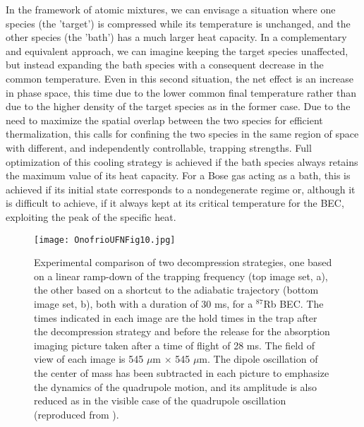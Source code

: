 \documentclass[pra,letterpaper,twocolumn,showpacs,superscriptaddress]{revtex4}
\begin{document}
In the framework of atomic mixtures, we can envisage a situation where one species (the 'target') is compressed while its temperature 
is unchanged, and the other species (the 'bath') has a much larger heat capacity. In a complementary and equivalent approach, we can 
imagine keeping the target species unaffected, but instead expanding the bath species with a consequent decrease in the common temperature. 
Even in this second situation, the net effect is an increase in phase space, this time due to the lower common final temperature rather than  
due to the higher density of the target species as in the former case. Due to the need to maximize the spatial overlap between the two species for 
efficient thermalization, this calls for confining the two species in the same region of space with different, and independently controllable, trapping strengths. 
Full optimization of this cooling strategy is achieved if the bath species always retains the maximum value of its heat capacity. 
For a Bose gas acting as a bath, this is achieved if its initial state corresponds to a nondegenerate regime or, although it is difficult to achieve, 
if it always kept at its critical temperature for the BEC, exploiting the peak of the specific heat. 

\begin{figure*}[t]
\begin{center}
\texttt{[image: OnofrioUFNFig10.jpg]}
\caption{Experimental comparison of two decompression strategies, one based on a linear ramp-down of the trapping 
frequency (top image set, a), the other based on a shortcut to the adiabatic trajectory (bottom image set, b), both with 
a duration of 30 ms, for a ${}^{87}$Rb BEC. The times indicated in each image are the hold times 
in the trap after the decompression strategy and before the release for the absorption imaging picture taken after a time 
of flight of 28 ms. The field of view of each image is 545 $\mu$m $\times$ 545 $\mu$m. The dipole oscillation of the 
center of mass has been subtracted in each picture to emphasize the dynamics of the quadrupole motion, and its 
amplitude is also reduced as in the visible case of the quadrupole oscillation (reproduced from \cite{Schaff2011NJP}).}
\end{center}
\end{figure*}
\end{document}
